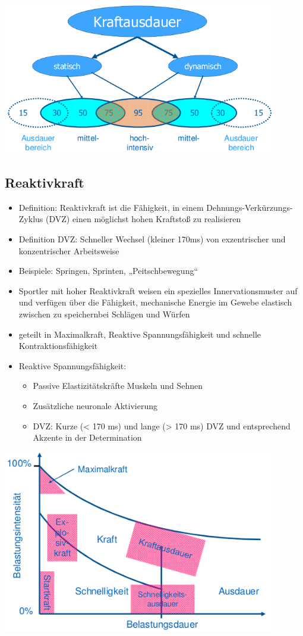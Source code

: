  \includegraphics[width=0.90\textwidth]{pictures/kraftausdauer}

 \subsection{Reaktivkraft}

 \begin{itemize}
    \item Definition: Reaktivkraft ist die Fähigkeit, in einem Dehnungs-Verkürzungs-Zyklus (DVZ) einen möglichst hohen Kraftstoß zu realisieren
    \item Definition DVZ: Schneller Wechsel (kleiner 170ms) von exzentrischer und konzentrischer Arbeitsweise
    \item Beispiele: Springen, Sprinten, „Peitschbewegung“
    \item Sportler mit hoher Reaktivkraft weisen ein spezielles Innervationsmuster auf und verfügen über die Fähigkeit, mechanische Energie im Gewebe elastisch zwischen zu speichernbei Schlägen und Würfen
    \item geteilt in Maximalkraft, Reaktive Spannungsfähigkeit und schnelle Kontraktionsfähigkeit
    \item Reaktive Spannungsfähigkeit:
    \begin{itemize}
        \item Passive Elastizitätskräfte Muskeln und Sehnen
        \item Zusätzliche neuronale Aktivierung
        \item DVZ: Kurze (< 170 ms) und lange (> 170 ms) DVZ und entsprechend Akzente in der Determination
    \end{itemize}
\end{itemize}

\includegraphics[width=0.90\textwidth]{pictures/landkarte}
